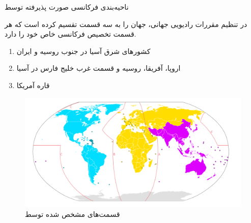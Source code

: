 \newpage
\Question
{ناحیه‌بندی فرکانسی صورت پذیرفته توسط }
{
	 در تنظیم مقررات رادیویی جهانی، جهان را به سه قسمت تقسیم کرده است که هر قسمت تخصیص فرکانسی خاص خود را دارد.
	
	\begin{enumerate}
		\item کشورهای شرق آسیا در جنوب روسیه و ایران
		\item اروپا، آفریقا، روسیه و قسمت غرب خلیج فارس در آسیا
		\item قاره آمریکا
	\end{enumerate}

\begin{figure}[H]
    \includegraphics[width=0.85\columnwidth]{Images/ITU_Regions.png}
    \centering
    \caption{قسمت‌های مشخص شده توسط 
    	}
\end{figure}
}
